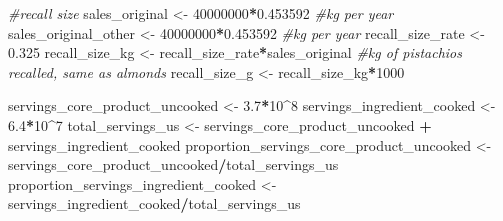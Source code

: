 \documentclass[
]{article}
\newenvironment{Shaded}{\begin{snugshade}}{\end{snugshade}}
\newcommand{\CommentTok}[1]{\textcolor[rgb]{0.56,0.35,0.01}{\textit{#1}}}
\newcommand{\DecValTok}[1]{\textcolor[rgb]{0.00,0.00,0.81}{#1}}
\newcommand{\FloatTok}[1]{\textcolor[rgb]{0.00,0.00,0.81}{#1}}
\newcommand{\NormalTok}[1]{#1}
\newcommand{\OtherTok}[1]{\textcolor[rgb]{0.56,0.35,0.01}{#1}}
\newcommand{\SpecialCharTok}[1]{\textcolor[rgb]{0.81,0.36,0.00}{\textbf{#1}}}
\begin{document}
\begin{Shaded}
\begin{Highlighting}[]
\CommentTok{\#recall size}
\NormalTok{sales\_original }\OtherTok{\textless{}{-}} \DecValTok{40000000}\SpecialCharTok{*}\FloatTok{0.453592}  \CommentTok{\#kg per year}
\NormalTok{sales\_original\_other }\OtherTok{\textless{}{-}} \DecValTok{40000000}\SpecialCharTok{*}\FloatTok{0.453592}  \CommentTok{\#kg per year}
\NormalTok{recall\_size\_rate }\OtherTok{\textless{}{-}} \FloatTok{0.325}
\NormalTok{recall\_size\_kg }\OtherTok{\textless{}{-}}\NormalTok{ recall\_size\_rate}\SpecialCharTok{*}\NormalTok{sales\_original }\CommentTok{\#kg of pistachios recalled, same as almonds}
\NormalTok{recall\_size\_g }\OtherTok{\textless{}{-}}\NormalTok{ recall\_size\_kg}\SpecialCharTok{*}\DecValTok{1000}

\NormalTok{servings\_core\_product\_uncooked }\OtherTok{\textless{}{-}} \FloatTok{3.7}\SpecialCharTok{*}\DecValTok{10}\SpecialCharTok{\^{}}\DecValTok{8}
\NormalTok{servings\_ingredient\_cooked }\OtherTok{\textless{}{-}} \FloatTok{6.4}\SpecialCharTok{*}\DecValTok{10}\SpecialCharTok{\^{}}\DecValTok{7}
\NormalTok{total\_servings\_us }\OtherTok{\textless{}{-}}\NormalTok{ servings\_core\_product\_uncooked }\SpecialCharTok{+}\NormalTok{ servings\_ingredient\_cooked}
\NormalTok{proportion\_servings\_core\_product\_uncooked }\OtherTok{\textless{}{-}}\NormalTok{ servings\_core\_product\_uncooked}\SpecialCharTok{/}\NormalTok{total\_servings\_us}
\NormalTok{proportion\_servings\_ingredient\_cooked }\OtherTok{\textless{}{-}}\NormalTok{ servings\_ingredient\_cooked}\SpecialCharTok{/}\NormalTok{total\_servings\_us}
\end{Highlighting}
\end{Shaded}
\end{document}
